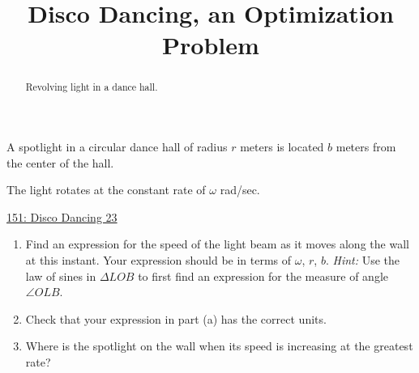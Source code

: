 \documentclass{ximera}
\title{Disco Dancing, an Optimization Problem}
\begin{document}
\begin{abstract}
Revolving light in a dance hall.
\end{abstract}
\maketitle

\begin{question}  \label{QdsadfKGDCCCC}
A spotlight in a circular dance hall of radius $r$ meters is located $b$ meters from the center of the hall. 

The light rotates at the constant rate of $\omega$ rad/sec. 

\begin{onlineOnly}
   \begin{center}
\end{center}
\end{onlineOnly}

\href{https://www.desmos.com/calculator/tebxtyad6a}{151: Disco Dancing 23}


\begin{enumerate}
\item Find an expression for the speed of the light beam as it moves along the wall at this instant. Your expression should be in terms of $\omega$, $r$, $b$. \emph{Hint:} Use the law of sines in $\Delta LOB$ to first find an expression for the measure of angle $\angle OLB$.

\item Check that your expression in  part (a) has the correct units.

\item Where is the spotlight on the wall when its speed is increasing at the greatest rate?

\end{enumerate}

\end{question}
\end{document}

